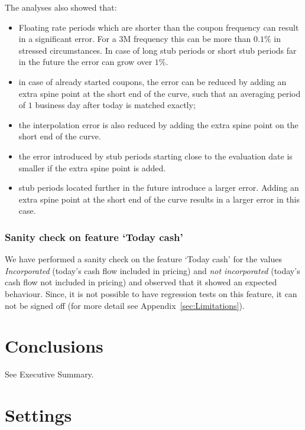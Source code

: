 \documentclass[]{pmv_report} %
\begin{document}
The analyses also showed that:
\begin{itemize}
 \item Floating rate periods which are shorter than the coupon frequency can result in a significant error.
 For a $3$M frequency this can be more than $0.1\%$ in stressed circumstances.
 In case of long stub periods or short stub periods far in the future the error can grow over $1\%$.
 \item in case of already started coupons, the error can be reduced by adding an extra spine point at the short end of the curve, such that an averaging period of $1$ business day after today is matched exactly;
 \item the interpolation error is also reduced by adding the extra spine point on the short end of the curve.
 \item the error introduced by stub periods starting close to the evaluation date is smaller if the extra spine point is added.
 \item stub periods located further in the future introduce a larger error.
 Adding an extra spine point at the short end of the curve results in a larger error in this case.
\end{itemize}


\subsubsection{Sanity check on feature `Today cash'}
We have performed a sanity check on the feature `Today cash' for the values \textit{Incorporated} (today's cash flow included in pricing) and \textit{not incorporated} (today's cash flow not included in pricing) and observed that it showed an expected behaviour.
Since, it is not possible to have regression tests on this feature, it can not be signed off (for more detail see Appendix~\ref{sec:Limitations}).


\section{Conclusions}
See Executive Summary.

\newpage


\newpage
\appendix
\small

\section{Settings}
\label{sec:settings}


\label{sec:Limitations}
\newline
\newline

\end{document}
